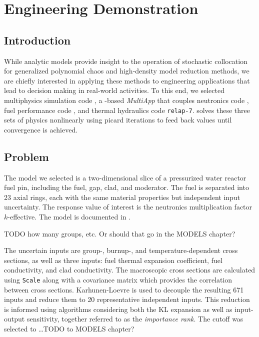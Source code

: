 
\chapter{Engineering Demonstration} %

\label{ch:mammoth} %



\section{Introduction}
While analytic models provide insight to the operation of stochastic collocation for generalized polynomial chaos and high-density
model reduction methods, we are chiefly interested in applying these methods to engineering applications that lead to
decision making in real-world activities.  To this end, we selected multiphysics simulation code \mammoth{}, a \moose{}-based
\emph{MultiApp} that couples neutronics code \rattlesnake{}, fuel performance code \bison{}, and thermal hydraulics code
\texttt{relap-7}.  \mammoth{} solves these three sets of physics nonlinearly using picard iterations to feed back values until
convergence is achieved.

\section{Problem}
The model we selected is a two-dimensional slice of a pressurized water reactor fuel pin, including the fuel, gap, clad, and
moderator.  The fuel is separated into 23 axial rings, each with the same material properties but independent input uncertainty.
The response value of interest is the neutronics multiplication factor $k$-effective.  The model is documented
in \cite{physormammoth}.

TODO how many groups, etc.  Or should that go in the MODELS chapter?

The uncertain inputs are group-, burnup-, and temperature-dependent cross sections, as well as three \bison{}
inputs: fuel thermal expansion coefficient, fuel conductivity, and clad conductivity.
The macroscopic cross sections are calculated using \texttt{Scale} \cite{scale} along with a covariance matrix which provides
the correlation between cross sections.  Karhunen-Loevre \cite{karhunen} is used to decouple the resulting 671 inputs and
reduce them to 20 representative independent inputs.  This reduction is informed using \raven{} algorithms
considering both the KL expansion as well as input-output sensitivity, together referred to as the
\emph{importance rank}.  The cutoff was selected to \ldots TODO to MODELS chapter?

